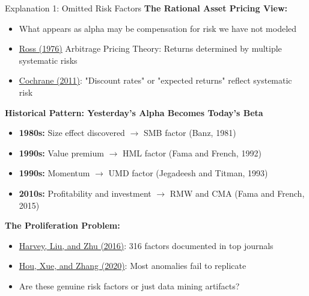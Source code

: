 \documentclass{beamer}
\begin{document}
\begin{frame}[allowframebreaks]{Explanation 1: Omitted Risk Factors}
    \textbf{The Rational Asset Pricing View:}
    \begin{itemize}
        \item What appears as alpha may be compensation for risk we have not modeled
        \item \textcolor{blue}{\href{https://doi.org/10.1142/9789814417358_0001}{Ross (1976)}} Arbitrage Pricing Theory: Returns determined by multiple systematic risks
        \item \textcolor{blue}{\href{https://onlinelibrary.wiley.com/doi/10.1111/j.1540-6261.2011.01671.x}{Cochrane (2011)}}: "Discount rates" or "expected returns" reflect systematic risk
    \end{itemize}

    \textbf{Historical Pattern: Yesterday's Alpha Becomes Today's Beta}
    \begin{itemize}
        \item \textbf{1980s:} Size effect discovered $\rightarrow$ SMB factor (Banz, 1981)
        \item \textbf{1990s:} Value premium $\rightarrow$ HML factor (Fama and French, 1992)
        \item \textbf{1990s:} Momentum $\rightarrow$ UMD factor (Jegadeesh and Titman, 1993)
        \item \textbf{2010s:} Profitability and investment $\rightarrow$ RMW and CMA (Fama and French, 2015)
    \end{itemize}
    
    \vspace{1cm}
    \textbf{The Proliferation Problem:}
    \begin{itemize}
        \item \textcolor{blue}{\href{https://doi.org/10.1093/rfs/hhv059}{Harvey, Liu, and Zhu (2016)}}: 316 factors documented in top journals
        \item \textcolor{blue}{\href{https://doi.org/10.1093/rfs/hhy131}{Hou, Xue, and Zhang (2020)}}: Most anomalies fail to replicate
        \item Are these genuine risk factors or just data mining artifacts?
    \end{itemize}
\end{frame}
\end{document}
